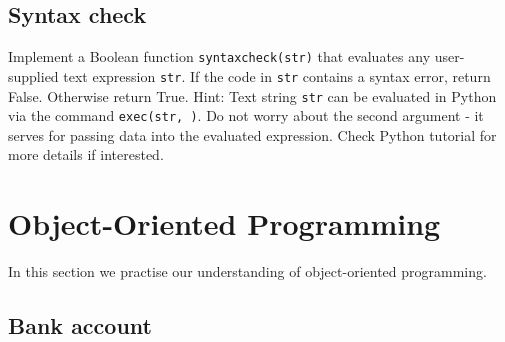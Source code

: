 
\subsection{Syntax check}

Implement a Boolean function {\tt syntaxcheck(str)} that evaluates any user-supplied text expression {\tt str}. If the code in {\tt str} contains a syntax error, return False. Otherwise return True. Hint: Text string {\tt str} can be evaluated in Python via the command {\tt exec(str, {})}. Do not worry about the second argument - it serves for passing data into the evaluated expression. Check Python tutorial for more details if interested.


\section{Object-Oriented Programming}

In this section we practise our understanding of object-oriented programming.


\subsection{Bank account}

